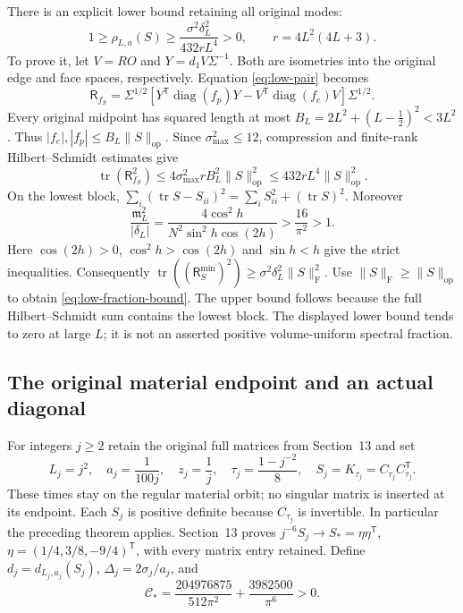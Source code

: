 There is an explicit lower bound retaining all original modes:
\begin{equation}\label{eq:low-fraction-bound}
 1\ge\rho_{L,a}(S)\ge
 \frac{\sigma^2\delta_L^2}{432rL^4}>0,\qquad
 r=4L^2(4L+3).
\end{equation}
To prove it, let $V=RO$ and $Y=d_1V\Sigma^{-1}$. Both are
isometries into the original edge and face spaces, respectively.
Equation \eqref{eq:low-pair} becomes
\[
 \mathsf R_{f_S}=\Sigma^{1/2}
  [Y^{\mathsf T}\operatorname{diag}(f_p)Y
             -V^{\mathsf T}\operatorname{diag}(f_e)V]\Sigma^{1/2}.
\]
Every original midpoint has squared length at most
$B_L=2L^2+(L-\tfrac12)^2<3L^2$. Thus
$|f_e|,|f_p|\le B_L\|S\|_{\mathrm{op}}$.
Since $\sigma_{\max}^2\le12$, compression and finite-rank
Hilbert--Schmidt estimates give
\[
 \operatorname{tr}(\mathsf R_{f_S}^2)
 \le 4\sigma_{\max}^2rB_L^2\|S\|_{\mathrm{op}}^2
 \le432rL^4\|S\|_{\mathrm{op}}^2.
\]
On the lowest block,
$\sum_i(\operatorname{tr}S-S_{ii})^2
=\sum_iS_{ii}^2+(\operatorname{tr}S)^2$.
Moreover
\[
 \frac{\mathfrak m_L^2}{|\delta_L|}
 =\frac{4\cos^2h}{N^2\sin^2h\cos(2h)}
 >\frac{16}{\pi^2}>1.
\]
Here $\cos(2h)>0$, $\cos^2h>\cos(2h)$ and $\sin h<h$
give the strict inequalities. Consequently
$\operatorname{tr}((\mathsf R_S^{\min})^2)
\ge\sigma^2\delta_L^2\|S\|_{\mathrm F}^2$.
Use $\|S\|_{\mathrm F}\ge\|S\|_{\mathrm{op}}$ to obtain
\eqref{eq:low-fraction-bound}. The upper bound follows because
the full Hilbert--Schmidt sum contains the lowest block.
The displayed lower bound tends to zero at large $L$; it is not
an asserted positive volume-uniform spectral fraction.

\subsection{The original material endpoint and an actual diagonal}

For integers $j\ge2$ retain the original full matrices from Section~13 and set
\begin{equation}\label{eq:low-diagonal}
 L_j=j^2,\quad a_j=\frac1{100j},\quad z_j=\frac1j,\quad
 \tau_j=\frac{1-j^{-2}}8,\quad S_j=K_{\tau_j}=C_{\tau_j}C_{\tau_j}^{\mathsf T}.
\end{equation}
These times stay on the regular material orbit; no singular matrix is
inserted at its endpoint. Each $S_j$ is positive definite because
$C_{\tau_j}$ is invertible. In particular the preceding theorem applies.
Section~13 proves $j^{-6}S_j\to S_*=\eta\eta^{\mathsf T}$,
$\eta=(1/4,3/8,-9/4)^{\mathsf T}$, with every matrix entry retained.
Define $d_j=d_{L_j,a_j}(S_j)$, $\Delta_j=2\sigma_j/a_j$, and
\begin{equation}\label{eq:low-constant}
 \mathcal C_*=
 \frac{204976875}{512\pi^2}+\frac{3982500}{\pi^6}>0 .
\end{equation}

